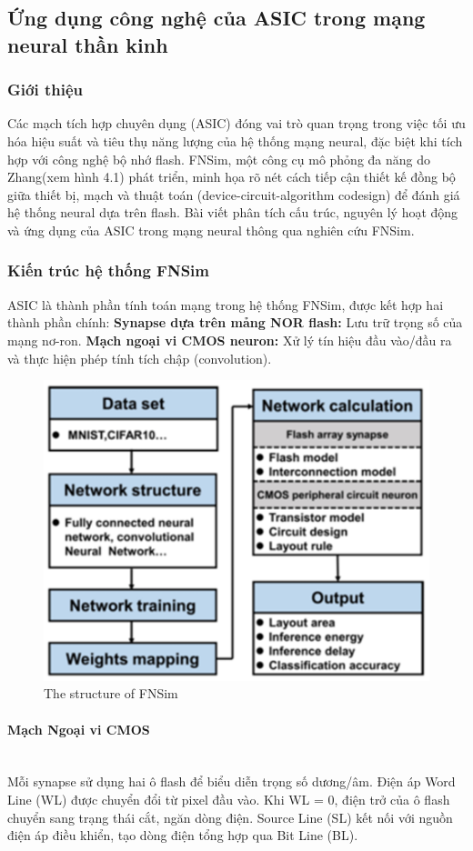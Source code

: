 \documentclass[a4paper]{article}
\begin{document}
\subsection{Ứng dụng công nghệ của ASIC trong mạng neural thần kinh}
\subsubsection{Giới thiệu}
Các mạch tích hợp chuyên dụng (ASIC) đóng vai trò quan trọng trong việc tối ưu hóa hiệu suất và tiêu thụ năng lượng của hệ thống mạng neural, đặc biệt khi tích hợp với công nghệ bộ nhớ flash. FNSim, một công cụ mô phỏng đa năng do Zhang(xem hình 4.1) phát triển, minh họa rõ nét cách tiếp cận thiết kế đồng bộ giữa thiết bị, mạch và thuật toán (device-circuit-algorithm codesign) để đánh giá hệ thống neural dựa trên flash. Bài viết phân tích cấu trúc, nguyên lý hoạt động và ứng dụng của ASIC trong mạng neural thông qua nghiên cứu FNSim.

\subsubsection{Kiến trúc hệ thống FNSim}
ASIC là thành phần tính toán mạng trong hệ thống FNSim, được kết hợp hai thành phần chính:
\textbf{Synapse dựa trên mảng NOR flash:} Lưu trữ trọng số của mạng nơ-ron.
\textbf{Mạch ngoại vi CMOS neuron:} Xử lý tín hiệu đầu vào/đầu ra và thực hiện phép tính tích chập (convolution).

\begin{figure}[H]
    \centering
    \includegraphics[width=0.75\linewidth]{assets/asic-f6.png}
    \caption{The structure of FNSim}
    \label{fig:enter-label}
\end{figure}

\paragraph{Mạch Ngoại vi CMOS} \leavevmode\\
Mỗi synapse sử dụng hai ô flash để biểu diễn trọng số dương/âm.
Điện áp Word Line (WL) được chuyển đổi từ pixel đầu vào. Khi WL = 0, điện trở của ô flash chuyển sang trạng thái cắt, ngăn dòng điện.
Source Line (SL) kết nối với nguồn điện áp điều khiển, tạo dòng điện tổng hợp qua Bit Line (BL).
\end{document}
